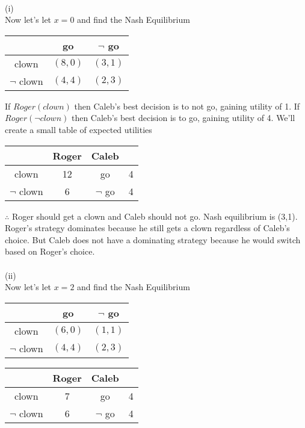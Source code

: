 \documentclass[12pt,letter]{article}
\begin{document}
\\
(i)\\
Now let's let $x=0$ and find the Nash Equilibrium
\begin{figure*}[h]
\centering
\begin{tabular}{|c|c|c|}
	\hline
	& go & $\neg$ go\\
	\hline
	clown & $(8,0)$ & $(3,1)$\\
	\hline
	$\neg$ clown & $(4,4)$ & $(2,3)$\\
	\hline
\end{tabular}
\end{figure*}
If $Roger(clown)$ then Caleb's best decision is to not go, gaining utility of 1.
If $Roger(\neg clown)$ then Caleb's best decision is to go, gaining utility of 4.
We'll create a small table of expected utilities
\begin{figure*}[h!]
\centering
\begin{tabular}{c c|c c}
	& Roger & Caleb\\
	\hline
	clown & 12 & go & 4\\
	$\neg$ clown & 6 & $\neg$ go & 4
\end{tabular}
\end{figure*}
\FloatBarrier
$\therefore$ Roger should get a clown and Caleb should not go. Nash equilibrium 
is (3,1). Roger's strategy
dominates because he still gets a clown regardless of Caleb's choice. But Caleb
does not have a dominating strategy because he would switch based on Roger's 
choice.
\\
\\
(ii)\\
Now let's let $x=2$ and find the Nash Equilibrium
\begin{figure*}[h!]
\centering
\begin{tabular}{|c|c|c|}
	\hline
	& go & $\neg$ go\\
	\hline
	clown & $(6,0)$ & $(1,1)$\\
	\hline
	$\neg$ clown & $(4,4)$ & $(2,3)$\\
	\hline
\end{tabular}
\end{figure*}
\begin{figure*}[h!]
\centering
\begin{tabular}{c c|c c}
	& Roger & Caleb\\
	\hline
	clown & 7 & go & 4\\
	$\neg$ clown & 6 & $\neg$ go & 4
\end{tabular}
\end{figure*}
\FloatBarrier
\end{document}

